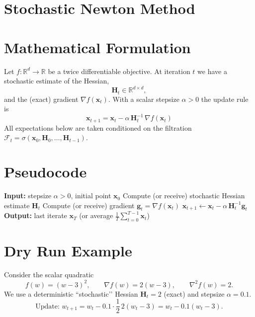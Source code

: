 \documentclass{article}
\newcommand{\R}{\mathbb{R}}
\newcommand{\grad}{\nabla}
\newcommand{\Hess}{\nabla^{2}}
\begin{document}
\section*{Stochastic Newton Method}

\section*{Mathematical Formulation}
Let $f:\R^{d}\to\R$ be a twice differentiable objective.  
At iteration $t$ we have a stochastic estimate of the Hessian,
\[
\mathbf H_{t}\in\R^{d\times d},
\]
and the (exact) gradient $\grad f(\mathbf x_{t})$.  
With a scalar stepsize $\alpha>0$ the update rule is
\begin{equation}
\boxed{\;
\mathbf x_{t+1}= \mathbf x_{t}-\alpha\,\mathbf H_{t}^{-1}\,\grad f(\mathbf x_{t})\; } \tag{1}
\end{equation}
All expectations below are taken conditioned on the filtration
$\mathcal F_{t}= \sigma(\mathbf x_{0},\mathbf H_{0},\dots,\mathbf H_{t-1})$.

\section*{Pseudocode}
\begin{algorithm}[H]
\caption{Stochastic Newton Method}
\begin{algorithmic}[1]
\State \textbf{Input:} stepsize $\alpha>0$, initial point $\mathbf x_{0}$
    \State Compute (or receive) stochastic Hessian estimate $\mathbf H_{t}$
    \State Compute (or receive) gradient $\mathbf g_{t}= \grad f(\mathbf x_{t})$
    \State $\displaystyle \mathbf x_{t+1}\gets \mathbf x_{t}-\alpha\,\mathbf H_{t}^{-1}\mathbf g_{t}$
\EndFor
\State \textbf{Output:} last iterate $\mathbf x_{T}$ (or average $\frac1T\sum_{t=0}^{T-1}\mathbf x_{t}$)
\end{algorithmic}
\end{algorithm}

\section*{Dry Run Example}
Consider the scalar quadratic
\[
f(w)= (w-3)^{2},\qquad \grad f(w)=2(w-3),\qquad \Hess f(w)=2 .
\]
We use a deterministic ``stochastic’’ Hessian $\mathbf H_{t}=2$ (exact) and stepsize $\alpha=0.1$.
\[
\text{Update: } w_{t+1}= w_{t}-0.1\cdot \frac{1}{2}\,2(w_{t}-3)=w_{t}-0.1(w_{t}-3).
\]
\end{document}
